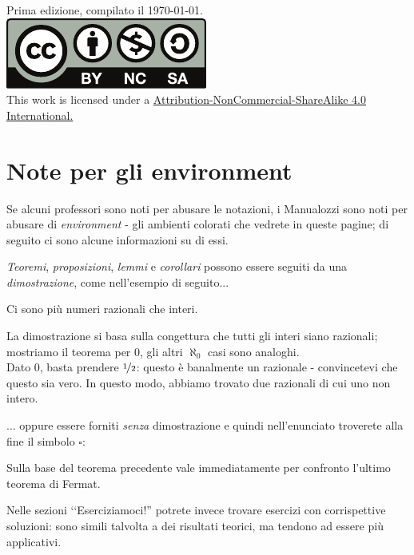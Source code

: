 \vfill
\begin{center}
	Prima edizione, compilato il \today.\\
			\includegraphics[trim=0cm 0cm 0cm 0cm,clip,scale=0.5]{images/Cc-by-nc-sa_icon.pdf}\\
	{\footnotesize This work is licensed under a \href{https://creativecommons.org/licenses/by-sa/4.0/}{Attribution-NonCommercial-ShareAlike 4.0 International.}}
\end{center}
\newpage
\section*{Note per gli environment}
Se alcuni professori sono noti per abusare le notazioni, i Manualozzi sono noti per abusare di \textit{environment} - gli ambienti colorati che vedrete in queste pagine; di seguito ci sono alcune informazioni su di essi.

\noindent\textit{Teoremi}, \textit{proposizioni}, \textit{lemmi} e \textit{corollari} possono essere seguiti da una \textit{dimostrazione}, come nell'esempio di seguito...
\begin{theoremanote}
	Ci sono più numeri razionali che interi.
\end{theoremanote}
\begin{demonstration}
	La dimostrazione si basa sulla congettura che tutti gli interi siano razionali; mostriamo il teorema per $0$, gli altri $\aleph_0$ casi sono analoghi.\\
	Dato $0$, basta prendere $\nicefrac{1}{2}$: questo è banalmente un razionale - convincetevi che questo sia vero. In questo modo, abbiamo trovato due razionali di cui uno non intero.
\end{demonstration}
... oppure essere forniti \textit{senza} dimostrazione e quindi nell'enunciato troverete alla fine il simbolo $\square$:
\begin{corollarynote}
	Sulla base del teorema precedente vale immediatamente per confronto l'ultimo teorema di Fermat.
\end{corollarynote}
Nelle sezioni ‘‘Eserciziamoci!'' potrete invece trovare esercizi con corrispettive soluzioni: sono simili talvolta a dei risultati teorici, ma tendono ad essere più applicativi.

